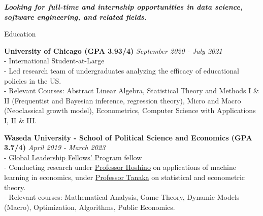 \documentclass{resume} %
\begin{document}
{\centerline {\em \textbf { Looking for full-time and internship opportunities in data science, software engineering, and related fields. } } }

\begin{rSection}{Education}

{\bf University of Chicago (GPA 3.93/4) } \hfill {\em September 2020 - July 2021} 
\\- International Student-at-Large
\\- Led research team of undergraduates analyzing the efficacy of educational policies in the US. 
\\- Relevant Courses: Abstract Linear Algebra, Statistical Theory and Methods I \& II (Frequentist and Bayesian inference, regression theory), Micro and Macro (Neoclassical growth model), Econometrics, Computer Science with Applications \href{https://www.classes.cs.uchicago.edu/archive/2020/fall/12100-1/}{I}, \href{https://www.classes.cs.uchicago.edu/archive/2020/winter/12200-1/}{II} \& \href{https://www.classes.cs.uchicago.edu/archive/2021/spring/12300-1/}{III}.

{\bf Waseda University - School of Political Science and Economics (GPA 3.7/4) } \hfill {\em April 2019 - March 2023} 
\\- \href{http://www2.cie-waseda.jp/glfp/jp/about/program.html}{Global Leadership Fellows' Program} fellow
\\- Conducting research under \href{https://tadaohoshino.wordpress.com/}{Professor Hoshino} on applications of machine learning in economics, under \href{https://waseda.pure.elsevier.com/en/persons/hisatoshi-tanaka}{Professor Tanaka} on statistical and econometric theory. 
\\- Relevant courses: Mathematical Analysis, Game Theory, Dynamic Models (Macro), Optimization, Algorithms, Public Economics. 

%


\end{rSection}
\end{document}
